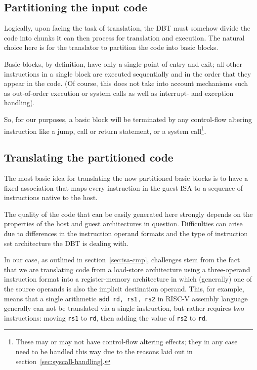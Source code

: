 \subsection{Partitioning the input code}
Logically, upon facing the task of translation, the DBT must somehow divide the code into chunks it can then process for translation and execution.
The natural choice here is for the translator to partition the code into basic blocks.

Basic blocks, by definition, have only a single point of entry and exit;
all other instructions in a single block are executed sequentially and in the order that they appear in the code.
(Of course, this does not take into account mechanisms such as out-of-order execution or system calls as well as interrupt- and exception handling).

So, for our purposes, a basic block will be terminated by any control-flow altering instruction like a jump, call or return statement, or a system call\footnote{These may or may not have control-flow altering effects; they in any case need to be handled this way due to the reasons laid out in section~\vref{sec:syscall-handling}.}.



\subsection{Translating the partitioned code}
The most basic idea for translating the now partitioned basic blocks is to have a fixed association that maps every instruction in the guest ISA to a sequence of instructions native to the host.

The quality of the code that can be easily generated here strongly depends on the properties of the host and guest architectures in question.
Difficulties can arise due to differences in the instruction operand formats and the type of instruction set architecture the DBT is dealing with.

In our case, as outlined in section~\vref{sec:isa-cmp}, challenges stem from the fact that we are translating code from a load-store architecture using a three-operand instruction format into a register-memory architecture in which (generally) one of the source operands is also the implicit destination operand.
This, for example, means that a single arithmetic \texttt{add rd, rs1, rs2} in RISC-V assembly language generally can not be translated via a single instruction, but rather requires two instructions: moving \texttt{rs1} to \texttt{rd}, then adding the value of \texttt{rs2} to \texttt{rd}.

